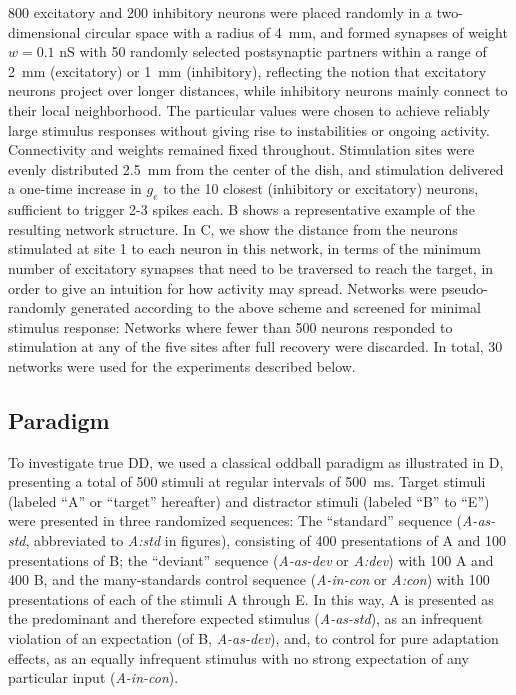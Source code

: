 \documentclass[9pt,lineno,onehalfspacing]{elife}
\newcommand{\dev}{\textit{A-as-dev}}
\newcommand{\msc}{\textit{A-in-con}}
\newcommand{\std}{\textit{A-as-std}}
\begin{document}
800 excitatory and 200 inhibitory neurons were placed randomly in a two-dimensional circular space with a radius of 4~mm, and formed synapses of weight $w = 0.1$ nS with 50 randomly selected postsynaptic partners within a range of 2~mm (excitatory) or 1~mm (inhibitory), reflecting the notion that excitatory neurons project over longer distances, while inhibitory neurons mainly connect to their local neighborhood. The particular values were chosen to achieve reliably large stimulus responses without giving rise to instabilities or ongoing activity. Connectivity and weights remained fixed throughout. Stimulation sites were evenly distributed 2.5~mm from the center of the dish, and stimulation delivered a one-time increase in $g_e$ to the 10 closest (inhibitory or excitatory) neurons, sufficient to trigger 2-3 spikes each. B shows a representative example of the resulting network structure. In C, we show the distance from the neurons stimulated at site 1 to each neuron in this network, in terms of the minimum number of excitatory synapses that need to be traversed to reach the target, in order to give an intuition for how activity may spread. Networks were pseudo-randomly generated according to the above scheme and screened for minimal stimulus response: Networks where fewer than 500 neurons responded to stimulation at any of the five sites after full recovery were discarded. In total, 30 networks were used for the experiments described below.

\subsection{Paradigm}\label{sec:paradigm}

To investigate true DD, we used a classical oddball paradigm as illustrated in D, presenting a total of 500 stimuli at regular intervals of 500~ms. Target stimuli (labeled ``A'' or ``target'' hereafter) and distractor stimuli (labeled ``B'' to ``E'') were presented in three randomized sequences: The ``standard'' sequence (\std{}, abbreviated to \textit{A:std} in figures), consisting of 400 presentations of A and 100 presentations of B; the ``deviant'' sequence (\dev{} or \textit{A:dev}) with 100 A and 400 B, and the many-standards control sequence (\msc{} or \textit{A:con}) with 100 presentations of each of the stimuli A through E. In this way, A is presented as the predominant and therefore expected stimulus (\std{}), as an infrequent violation of an expectation (of B, \dev{}), and, to control for pure adaptation effects, as an equally infrequent stimulus with no strong expectation of any particular input (\msc{}).
\end{document}
